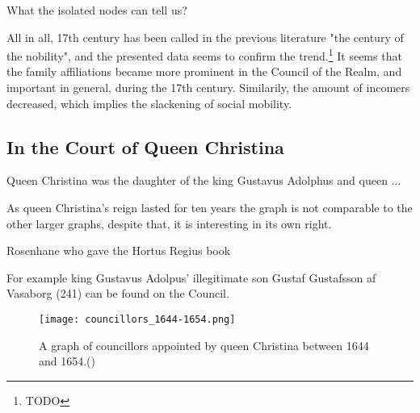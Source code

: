 What the isolated nodes can tell us?

All in all, 17th century has been called in the previous literature "the century of the nobility", and the presented data seems to confirm the trend.\footnote{TODO} It seems that the family affiliations became more prominent in the Council of the Realm, and important in general, during the 17th century. Similarily, the amount of incomers decreased, which implies the slackening of social mobility.

\subsection{In the Court of Queen Christina}
\label{christina}
Queen Christina was the daughter of the king Gustavus Adolphus and queen ...

As queen Christina's reign lasted for ten years the graph is not comparable to the other larger graphs, despite that, it is interesting in its own right. 

Rosenhane who gave the Hortus Regius book

For example king Gustavus Adolpus' illegitimate son Gustaf Gustafsson af Vasaborg (241) can be found on the Council. 
\begin{figure}
	\texttt{[image: councillors\_1644-1654.png]}
	\caption[Councillors appointed by queen Christina]{A graph of councillors appointed by queen Christina between 1644 and 1654.(\cite{councillorsDS})} 
	\centering
\end{figure}

